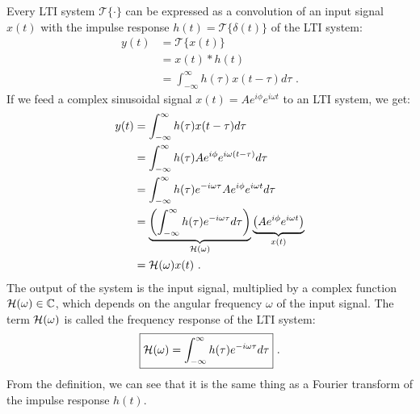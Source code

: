 Every LTI system $\mathcal{T}\{\cdot\}$ can be expressed as a
convolution of an input signal $x(t)$ with the impulse response $h(t)=\mathcal{T}\{\delta(t)\}$
of the LTI system:
\begin{align}
    y(t) & = \mathcal{T}\{x(t)\}                                  \\
         & = x(t)*h(t)                                            \\
         & =\int_{-\infty}^{\infty} h(\tau) x(t-\tau) d\tau \,\,.
\end{align}
If we feed a complex sinusoidal signal $x(t)=Ae^{i\phi}e^{i\omega t}$
to an LTI system, we get:
\begin{align}
    y(t) & = \int_{-\infty}^{\infty} h(\tau)x(t-\tau) d\tau                                                                                                        \\
         & = \int_{-\infty}^{\infty} h(\tau) A e^{i\phi} e^{i\omega(t-\tau)}  d\tau                                                                                \\
         & = \int_{-\infty}^{\infty}h(\tau) e^{-i \omega \tau} A e^{i\phi} e^{i \omega t } d\tau                                                                   \\
         & = \underbrace{\left(\int_{-\infty}^{\infty} h(\tau) e^{-i \omega \tau} d\tau\right)}_{\mathcal{H}(\omega)} \underbrace{\left(A e^{i\phi} e^{i \omega t}\right)}_{x(t)} \\
         & = \mathcal{H}(\omega) x(t) \,\,. \label{eq:eig_ct}
\end{align}
The output of the system is the input signal, multiplied by a complex
function $\mathcal{H}(\omega) \in \mathbb{C}$, which depends on the angular frequency
$\omega$ of the input signal. The term $\mathcal{H}(\omega)$ is called the frequency
response of the LTI system:
\begin{equation}
    \boxed{
        \mathcal{H}(\omega) = \int_{-\infty}^{\infty} h(\tau) e^{-i \omega \tau} d\tau
    } \,\,.
    \label{eq:fresp_ct}
\end{equation}
From the definition, we can see that it is the same thing as a Fourier
transform of the impulse response $h(t)$.

